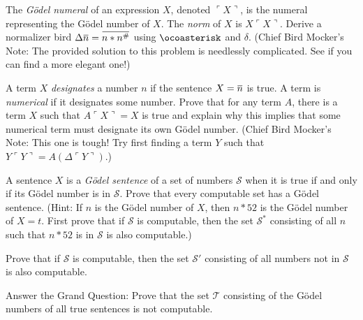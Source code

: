 \documentclass[12pt, letterpaper]{article}
\begin{document}
\begin{prob}{25.2}
The \emph{G\"odel numeral} of an expression $X$, denoted $\ulcorner X \urcorner$, is the numeral representing the G\"odel number of $X$. The \emph{norm} of $X$ is $X\ulcorner X \urcorner$. Derive a normalizer bird $\Delta \noverline{n} = \noverline{n \ast n^\#}$ using $\ocoasterisk$ and $\delta$. (Chief Bird Mocker's Note: The provided solution to this problem is needlessly complicated. See if you can find a more elegant one!)
\end{prob}

\begin{prob}{25.3}
A term $X$ \emph{designates} a number $n$ if the sentence $X = \noverline{n}$ is true. A term is \emph{numerical} if it designates some number. Prove that for any term $A$, there is a term $X$ such that $A\ulcorner X \urcorner = X$ is true and explain why this implies that some numerical term must designate its own G\"odel number. (Chief Bird Mocker's Note: This one is tough! Try first finding a term $Y$ such that $Y\ulcorner Y \urcorner = A(\Delta \ulcorner Y \urcorner)$.)
\end{prob}

\begin{prob}{25.4}
A sentence $X$ is a \emph{G\"odel sentence} of a set of numbers $\mathscr{S}$ when it is true if and only if its G\"odel number is in $\mathscr{S}$. Prove that every computable set has a G\"odel sentence. (Hint: If $n$ is the G\"odel number of $X$, then $n \ast 52$ is the G\"odel number of $X = t$. First prove that if $\mathscr{S}$ is computable, then the set $\mathscr{S}^*$ consisting of all $n$ such that $n \ast 52$ is in $\mathscr{S}$ is also computable.)
\end{prob}

\begin{prob}{25.5}
Prove that if $\mathscr{S}$ is computable, then the set $\mathscr{S}'$ consisting of all numbers not in $\mathscr{S}$ is also computable.
\end{prob}

\begin{prob}{25.6}
Answer the Grand Question: Prove that the set $\mathscr{T}$ consisting of the  G\"odel numbers of all true sentences is not computable.
\end{prob}
\end{document}
